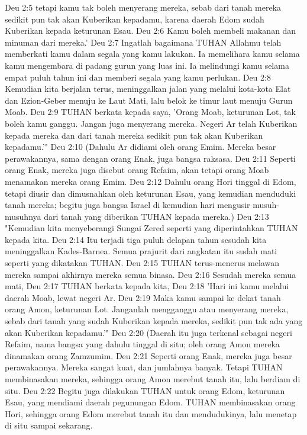 Deu 2:5  tetapi kamu tak boleh menyerang mereka, sebab dari tanah mereka sedikit pun tak akan Kuberikan kepadamu, karena daerah Edom sudah Kuberikan kepada keturunan Esau.
Deu 2:6  Kamu boleh membeli makanan dan minuman dari mereka.'
Deu 2:7  Ingatlah bagaimana TUHAN Allahmu telah memberkati kamu dalam segala yang kamu lakukan. Ia memelihara kamu selama kamu mengembara di padang gurun yang luas ini. Ia melindungi kamu selama empat puluh tahun ini dan memberi segala yang kamu perlukan.
Deu 2:8  Kemudian kita berjalan terus, meninggalkan jalan yang melalui kota-kota Elat dan Ezion-Geber menuju ke Laut Mati, lalu belok ke timur laut menuju Gurun Moab.
Deu 2:9  TUHAN berkata kepada saya, 'Orang Moab, keturunan Lot, tak boleh kamu ganggu. Jangan juga menyerang mereka. Negeri Ar telah Kuberikan kepada mereka dan dari tanah mereka sedikit pun tak akan Kuberikan kepadamu.'"
Deu 2:10  (Dahulu Ar didiami oleh orang Emim. Mereka besar perawakannya, sama dengan orang Enak, juga bangsa raksasa.
Deu 2:11  Seperti orang Enak, mereka juga disebut orang Refaim, akan tetapi orang Moab menamakan mereka orang Emim.
Deu 2:12  Dahulu orang Hori tinggal di Edom, tetapi diusir dan dimusnahkan oleh keturunan Esau, yang kemudian menduduki tanah mereka; begitu juga bangsa Israel di kemudian hari mengusir musuh-musuhnya dari tanah yang diberikan TUHAN kepada mereka.)
Deu 2:13  "Kemudian kita menyeberangi Sungai Zered seperti yang diperintahkan TUHAN kepada kita.
Deu 2:14  Itu terjadi tiga puluh delapan tahun sesudah kita meninggalkan Kades-Barnea. Semua prajurit dari angkatan itu sudah mati seperti yang dikatakan TUHAN.
Deu 2:15  TUHAN terus-menerus melawan mereka sampai akhirnya mereka semua binasa.
Deu 2:16  Sesudah mereka semua mati,
Deu 2:17  TUHAN berkata kepada kita,
Deu 2:18  'Hari ini kamu melalui daerah Moab, lewat negeri Ar.
Deu 2:19  Maka kamu sampai ke dekat tanah orang Amon, keturunan Lot. Janganlah mengganggu atau menyerang mereka, sebab dari tanah yang sudah Kuberikan kepada mereka, sedikit pun tak ada yang akan Kuberikan kepadamu.'"
Deu 2:20  (Daerah itu juga terkenal sebagai negeri Refaim, nama bangsa yang dahulu tinggal di situ; oleh orang Amon mereka dinamakan orang Zamzumim.
Deu 2:21  Seperti orang Enak, mereka juga besar perawakannya. Mereka sangat kuat, dan jumlahnya banyak. Tetapi TUHAN membinasakan mereka, sehingga orang Amon merebut tanah itu, lalu berdiam di situ.
Deu 2:22  Begitu juga dilakukan TUHAN untuk orang Edom, keturunan Esau, yang mendiami daerah pegunungan Edom. TUHAN membinasakan orang Hori, sehingga orang Edom merebut tanah itu dan mendudukinya, lalu menetap di situ sampai sekarang.
